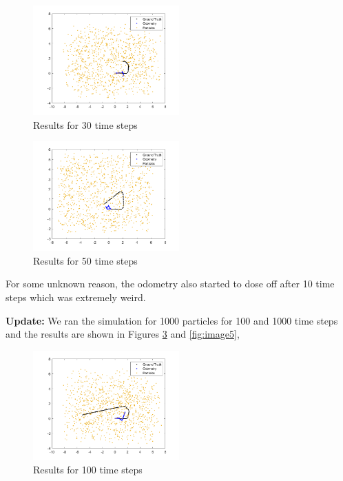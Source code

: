 \documentclass[answers]{exam}
\begin{document}
\begin{questions}
\begin{parts}
\begin{solution}
            \begin{figure}[H] %
                \centering
                \includegraphics[width=0.5\textwidth]{images/T=30.png} %
                \caption{Results for 30 time steps}
                \label{fig:image2} %
            \end{figure}

            \begin{figure}[H] %
                \centering
                \includegraphics[width=0.5\textwidth]{images/T=50.png} %
                \caption{Results for 50 time steps}
                \label{fig:image3} %
            \end{figure}
            For some unknown reason, the odometry also started to dose off after 10 time steps
            which was extremely weird.

            \textbf{Update:} We ran the simulation for 1000 particles for 100 and 1000 time
            steps and the results are shown in Figures \ref{fig:image4} and \ref{fig:image5},

            \begin{figure}[H] %
                \centering
                \includegraphics[width=0.5\textwidth]{images/T=100.png} %
                \caption{Results for 100 time steps}
                \label{fig:image4} %
            \end{figure}


\end{solution}
\end{parts}
\end{questions}
\end{document}
